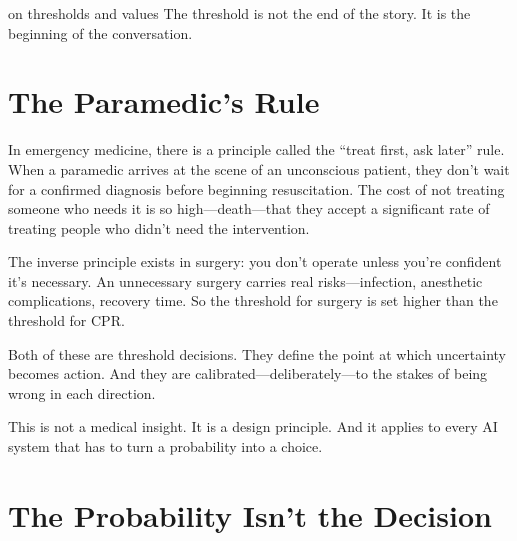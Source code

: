 
\label{chap:ch04}
\begin{chapterquote}{on thresholds and values}
The threshold is not the end of the story. It is the beginning of the conversation.
\end{chapterquote}

\section{The Paramedic's Rule}

In emergency medicine, there is a principle called the ``treat first, ask later'' rule. When a paramedic arrives at the scene of an unconscious patient, they don't wait for a confirmed diagnosis before beginning resuscitation. The cost of not treating someone who needs it is so high---death---that they accept a significant rate of treating people who didn't need the intervention.

The inverse principle exists in surgery: you don't operate unless you're confident it's necessary. An unnecessary surgery carries real risks---infection, anesthetic complications, recovery time. So the threshold for surgery is set higher than the threshold for CPR.

Both of these are threshold decisions. They define the point at which uncertainty becomes action. And they are calibrated---deliberately---to the stakes of being wrong in each direction.

This is not a medical insight. It is a design principle. And it applies to every AI system that has to turn a probability into a choice.

\section{The Probability Isn't the Decision}

